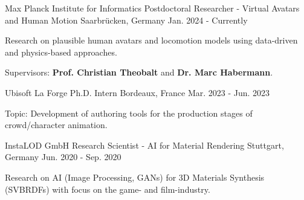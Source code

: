 

\begin{cventries}

\cventry
  {Max Planck Institute for Informatics} %
  {Postdoctoral Researcher - Virtual Avatars and Human Motion} %
  {Saarbrücken, Germany} %
  {Jan. 2024 - Currently} %
  {
    \begin{cvitems} %
      \item {Research on plausible human avatars and locomotion models using data-driven and physics-based approaches.}
      \item {Supervisors: \textbf{Prof. Christian Theobalt} and \textbf{Dr. Marc Habermann}.}
    \end{cvitems}
  }

\vspace{0.5cm}
\cventry
  {Ubisoft La Forge} %
  {Ph.D. Intern} %
  {Bordeaux, France} %
  {Mar. 2023 - Jun. 2023} %
  {
    \begin{cvitemone} %
      \item {Topic: Development of authoring tools for the production stages of crowd/character animation.}
    \end{cvitemone}
  }

\vspace{0cm}
\cventry
  {InstaLOD GmbH} %
  {Research Scientist - AI for Material Rendering} %
  {Stuttgart, Germany} %
  {Jun. 2020 - Sep. 2020} %
  {
    \begin{cvitemone} %
      \item {Research on AI (Image Processing, GANs) for 3D Materials Synthesis (SVBRDFs) with focus on the game- and film-industry.}
    \end{cvitemone}
  }


\end{cventries}
